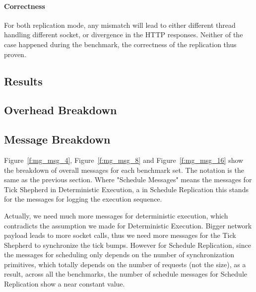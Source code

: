 \paragraph{Correctness} For both replication mode, any mismatch will lead to either different thread handling different socket, or divergence in the HTTP responses. Neither of the case happened during the benchmark, the correctness of the replication thus proven.

\subsection{Results}

\subsection{Overhead Breakdown}

\subsection{Message Breakdown}
Figure~\ref{f:mg_msg_4}, Figure~\ref{f:mg_msg_8} and Figure~\ref{f:mg_msg_16} show the breakdown of overall messages for each benchmark set. The notation is the same as the previous section. Where "Schedule Messages" means the messages for Tick Shepherd in Deterministic Execution, a in Schedule Replication this stands for the messages for logging the execution sequence.


Actually, we need much more messages for deterministic execution, which contradicts the assumption we made for Deterministic Execution. Bigger network payload leads to more socket calls, thus we need more messages for the Tick Shepherd to synchronize the tick bumps. However for Schedule Replication, since the messages for scheduling only depends on the number of synchronization primitives, which totally depends on the number of requests (not the size), as a result, across all the benchmarks, the number of schedule messages for Schedule Replication show a near constant value.

